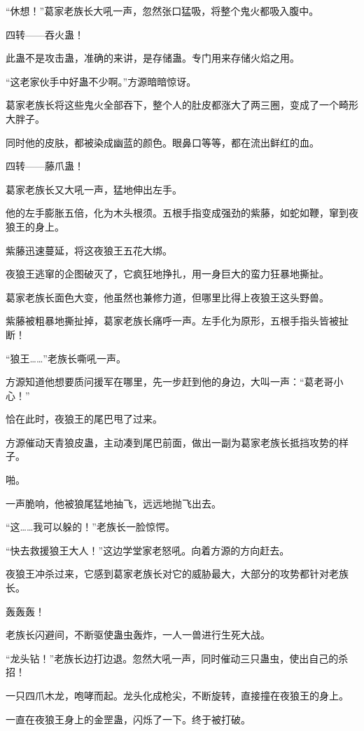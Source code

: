 \begin{this_body}
“休想！”葛家老族长大吼一声，忽然张口猛吸，将整个鬼火都吸入腹中。

四转——吞火蛊！

此蛊不是攻击蛊，准确的来讲，是存储蛊。专门用来存储火焰之用。

“这老家伙手中好蛊不少啊。”方源暗暗惊讶。

葛家老族长将这些鬼火全部吞下，整个人的肚皮都涨大了两三圈，变成了一个畸形大胖子。

同时他的皮肤，都被染成幽蓝的颜色。眼鼻口等等，都在流出鲜红的血。

四转——藤爪蛊！

葛家老族长又大吼一声，猛地伸出左手。

他的左手膨胀五倍，化为木头根须。五根手指变成强劲的紫藤，如蛇如鞭，窜到夜狼王的身上。

紫藤迅速蔓延，将这夜狼王五花大绑。

夜狼王逃窜的企图破灭了，它疯狂地挣扎，用一身巨大的蛮力狂暴地撕扯。

葛家老族长面色大变，他虽然也兼修力道，但哪里比得上夜狼王这头野兽。

紫藤被粗暴地撕扯掉，葛家老族长痛呼一声。左手化为原形，五根手指头皆被扯断！

“狼王……”老族长嘶吼一声。

方源知道他想要质问援军在哪里，先一步赶到他的身边，大叫一声：“葛老哥小心！”

恰在此时，夜狼王的尾巴甩了过来。

方源催动天青狼皮蛊，主动凑到尾巴前面，做出一副为葛家老族长抵挡攻势的样子。

啪。

一声脆响，他被狼尾猛地抽飞，远远地抛飞出去。

“这……我可以躲的！”老族长一脸惊愕。

“快去救援狼王大人！”这边学堂家老怒吼。向着方源的方向赶去。

夜狼王冲杀过来，它感到葛家老族长对它的威胁最大，大部分的攻势都针对老族长。

轰轰轰！

老族长闪避间，不断驱使蛊虫轰炸，一人一兽进行生死大战。

“龙头钻！”老族长边打边退。忽然大吼一声，同时催动三只蛊虫，使出自己的杀招！

一只四爪木龙，咆哮而起。龙头化成枪尖，不断旋转，直接撞在夜狼王的身上。

一直在夜狼王身上的金罡蛊，闪烁了一下。终于被打破。


\end{this_body}
